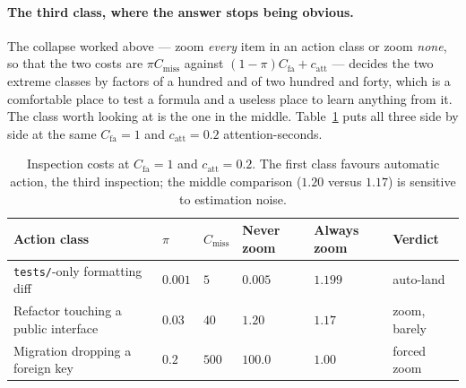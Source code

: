 \documentclass[11pt,a4paper]{article}
\theoremstyle{definition}
\theoremstyle{plain}
\begin{document}
\paragraph{The third class, where the answer stops being obvious.} The collapse
worked above --- zoom \emph{every} item in an action class or zoom \emph{none}, so
that the two costs are $\pi C_{\text{miss}}$ against
$(1-\pi)C_{\text{fa}} + c_{\mathrm{att}}$ --- decides the two extreme classes by
factors of a hundred and of two hundred and forty, which is a comfortable place to
test a formula and a useless place to learn anything from it. The class worth
looking at is the one in the middle. Table~\ref{tab:sdt-numbers} puts all three
side by side at the same $C_{\text{fa}}=1$ and $c_{\mathrm{att}}=0.2$
attention-seconds.

\begin{table}[H]
\centering
\small
\renewcommand{\arraystretch}{1.25}
\setlength{\tabcolsep}{2pt}
\begin{tabularx}{\textwidth}{@{}>{\raggedright\arraybackslash}X >{\centering\arraybackslash}p{} >{\centering\arraybackslash}p{} >{\centering\arraybackslash}p{} >{\centering\arraybackslash}p{} >{\raggedright\arraybackslash}p{}@{}}
\toprule
\textbf{Action class} & $\pi$ & $C_{\text{miss}}$ & \textbf{Never zoom} & \textbf{Always zoom} & \textbf{Verdict} \\
\midrule
\texttt{tests/}-only formatting diff & $0.001$ & $5$ & $0.005$ & $1.199$ & auto-land \\
Refactor touching a public interface & $0.03$ & $40$ & $1.20$ & $1.17$ & zoom, barely \\
Migration dropping a foreign key & $0.2$ & $500$ & $100.0$ & $1.00$ & forced zoom \\
\bottomrule
\end{tabularx}
\caption{Inspection costs at $C_{\mathrm{fa}}=1$ and $c_{\mathrm{att}}=0.2$. The first class favours automatic action, the third inspection; the middle comparison ($1.20$ versus $1.17$) is sensitive to estimation noise.}
\label{tab:sdt-numbers}
\end{table}
\end{document}
